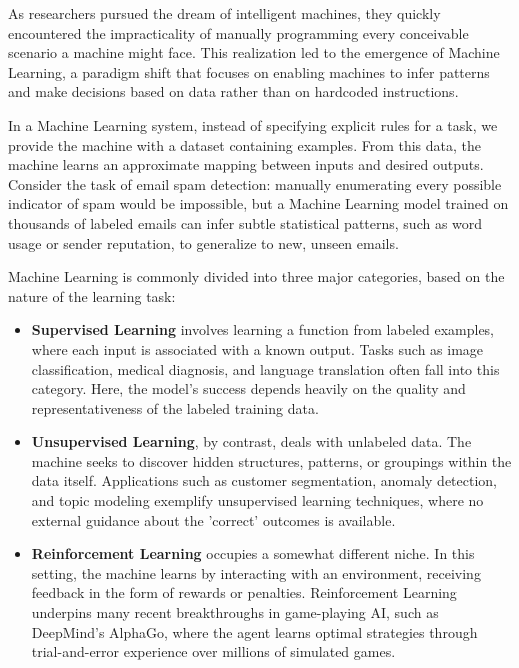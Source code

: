 \documentclass{book}
\begin{document}
As researchers pursued the dream of intelligent machines, they quickly 
encountered the impracticality of manually programming every conceivable 
scenario a machine might face. This realization led to the emergence of Machine 
Learning, a paradigm shift that focuses on enabling machines to infer patterns 
and make decisions based on data rather than on hardcoded instructions.

In a Machine Learning system, instead of specifying explicit rules for a task, 
we provide the machine with a dataset containing examples. From this data, the 
machine learns an approximate mapping between inputs and desired outputs. 
Consider the task of email spam detection: manually enumerating every possible 
indicator of spam would be impossible, but a Machine Learning model trained on 
thousands of labeled emails can infer subtle statistical patterns, such as word 
usage or sender reputation, to generalize to new, unseen emails.

Machine Learning is commonly divided into three major categories, based on the 
nature of the learning task:

\begin{itemize}
    \item \textbf{Supervised Learning} involves learning a function from labeled
    examples, where each input is associated with a known output. Tasks such as 
    image classification, medical diagnosis, and language translation often fall
    into this category. Here, the model's success depends heavily on the quality
    and representativeness of the labeled training data.
    
    \item \textbf{Unsupervised Learning}, by contrast, deals with unlabeled 
    data. The machine seeks to discover hidden structures, patterns, or 
    groupings within the data itself. Applications such as customer 
    segmentation, anomaly detection, and topic modeling exemplify unsupervised 
    learning techniques, where no external guidance about the 'correct' outcomes
    is available.
    
    \item \textbf{Reinforcement Learning} occupies a somewhat different niche. 
    In this setting, the machine learns by interacting with an environment, 
    receiving feedback in the form of rewards or penalties. Reinforcement 
    Learning underpins many recent breakthroughs in game-playing AI, such as 
    DeepMind's AlphaGo, where the agent learns optimal strategies through 
    trial-and-error experience over millions of simulated games.
\end{itemize}
\end{document}
